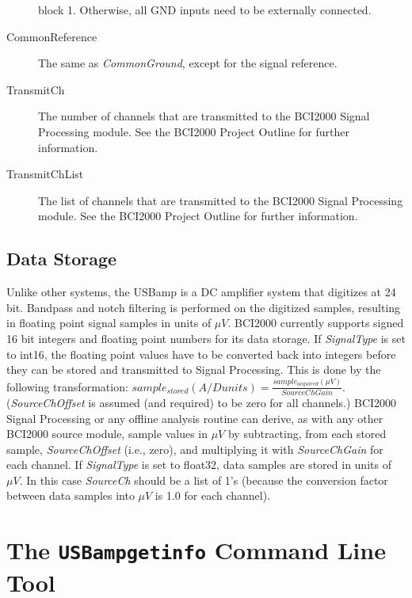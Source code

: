\documentclass[letterpaper, oneside, 12pt]{article}
\begin{document}
\begin{description}
                           block 1. Otherwise, all GND inputs need to be externally connected.
 \item [CommonReference]   The same as \emph{CommonGround}, except for the signal reference.
 \item [TransmitCh]        The number of channels that are transmitted to the BCI2000 
                           Signal Processing module. See the BCI2000 Project
                           Outline for further information.
 \item [TransmitChList]    The list of channels that are transmitted to the BCI2000 
                           Signal Processing module. See the BCI2000 Project
                           Outline for further information.                                                                        
\end{description}


\subsection{Data Storage}

Unlike other systems, the USBamp is a DC amplifier system that digitizes at 24 
bit. Bandpass and notch filtering is performed on the digitized samples, 
resulting in floating point signal samples in units of $\mu V$. BCI2000 
currently supports signed 16 bit integers and floating point numbers for its data storage.
If \emph{SignalType} is set to int16, the floating point values have 
to be converted back into integers before they can be stored and transmitted to 
Signal Processing. This is done by the following transformation: 
$sample_{stored}(A/D units)=\frac{sample_{acquired}(\mu V)}{SourceChGain}$. 
(\emph{SourceChOffset} is assumed (and required) to be zero for all channels.) 
BCI2000 Signal Processing or any offline analysis routine can derive, as with 
any other BCI2000 source module, sample values in $\mu V$ by subtracting, from 
each stored sample, \emph{SourceChOffset} (i.e., zero), and multiplying it with 
\emph{SourceChGain} for each channel. If \emph{SignalType} is set to float32,
data samples are stored in units of $\mu V$. In this case \emph{SourceCh} should be
a list of 1's (because the conversion factor between data samples into $\mu V$ is
1.0 for each channel).

\section{The \texttt{USBampgetinfo} Command Line Tool}
\end{document}

